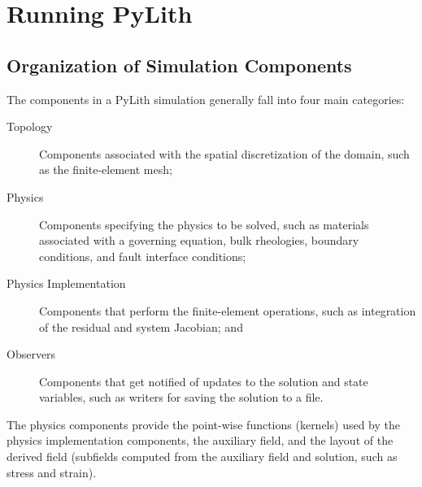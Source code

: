 \chapter{Running PyLith}
\label{cha:running}

\section{Organization of Simulation Components}

The components in a PyLith simulation generally fall into four main
categories:
\begin{description}
\item[Topology] Components associated with the spatial discretization
  of the domain, such as the finite-element mesh;
\item[Physics] Components specifying the physics to be solved, such as
  materials associated with a governing equation, bulk rheologies,
  boundary conditions, and fault interface conditions;
\item[Physics Implementation] Components that perform the
  finite-element operations, such as integration of the residual and
  system Jacobian; and
\item[Observers] Components that get notified of updates to the
  solution and state variables, such as writers for saving the
  solution to a file.
\end{description}
The physics components provide the point-wise functions (kernels) used
by the physics implementation components, the auxiliary field, and the
layout of the derived field (subfields computed from the auxiliary
field and solution, such as stress and strain).

